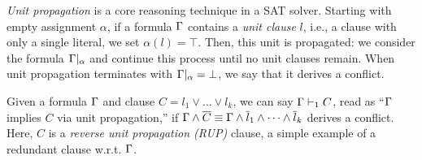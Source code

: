 %
%
%
\emph{Unit propagation} is a core reasoning technique in a SAT solver. Starting
with empty assignment $\alpha$, if a formula $\Gamma$ contains a \emph{unit
clause} $l$, i.e., a clause with only a single literal, we set $\alpha(l) =
\top$. Then, this unit is propagated: we consider the formula $\Gamma|_\alpha$
and continue this process until no unit clauses remain. When unit propagation
terminates with $\Gamma|_\alpha = \bot$, we say that it derives a conflict.
%
%

Given a formula $\Gamma$ and clause $C = l_1 \lor \dots \lor l_k$, we can say
$\Gamma \vdash_1 C$, read as ``$\Gamma$ implies $C$ via unit propagation,''
if $\Gamma \land \overline{C} \equiv \Gamma \land \overline{l}_1 \land \dots
\land \overline{l}_k$ derives a conflict. Here, $C$ is a \emph{reverse unit propagation (RUP)}
clause, a simple example of a redundant clause w.r.t. $\Gamma$. 


